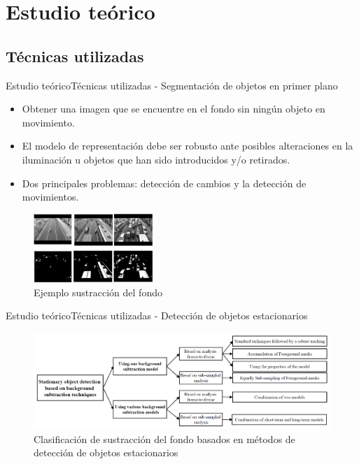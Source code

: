 \section{Estudio teórico}

\subsection{Técnicas utilizadas}

\begin{frame}{Estudio teórico}{Técnicas utilizadas - Segmentación de objetos en primer plano}

\begin{itemize}
    \justifying
    \item Obtener una imagen que se encuentre en el fondo sin ningún objeto en movimiento.
    \item El modelo de representación debe ser robusto ante posibles alteraciones en la iluminación u objetos que han sido introducidos y/o retirados.
    \item Dos principales problemas: detección de cambios y la detección de movimientos.
\end{itemize}


\begin{figure}[ht]
\centering
\includegraphics[width=0.4\textwidth]{Images/estudio-teorico/background-subtraction-example.jpg}
\caption{\label{fig:background-subtraction-example}Ejemplo sustracción del fondo}
\end{figure}

\end{frame}


\begin{frame}{Estudio teórico}{Técnicas utilizadas - Detección de objetos estacionarios}

\begin{figure}[ht]
\centering
\includegraphics[width=1\textwidth]{Images/estudio-teorico/metodos-sustraccion-fondo-deteccion-fondo-estacionario.png}
\caption{\label{fig:metodos-sustraccion-fondo-deteccion-fondo-estacionario}Clasificación de sustracción del fondo basados en métodos de detección de objetos estacionarios}
\end{figure}

\end{frame}

